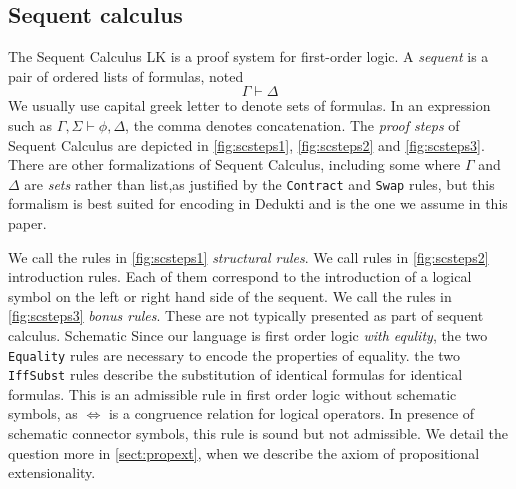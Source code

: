 \documentclass{article}
\begin{document}
	\iffalse
	We consider first order logic with arbitrary constant function and predicate symbols. Fomally We fix:
	\begin{itemize}
		\item a set of constant symbols $C$ noted $f^j, g^j, h^j, f^j_i,...$ for indices $i\in \mathbb{N}$ and where the superscript $j$ denotes the \textit{arity} of the symbol
		\item a countably infinite set of schematic function symbols $'C$ noted $ 'f^j, 'g^j, 'h^j, f^j_i,...$ for indices $i\in \mathbb{N}$ and where the superscript $j$ denotes the \textit{arity} of the symbol.
	\end{itemize}
	We also call schematic functions symbols of arity 0 \textit{variables}, and note them $x,y,z$.
	The set of terms of height at most $n$ is
	$$\mathcal{T}_0 := \lbrace f^0 \mid f^0 \in C\rbrace \cup \lbrace 'f^0 \mid 'f^0 \in C \rbrace$$
	$$\mathcal{T}_{n+1} := \mathcal{T}_n \cup \lbrace f^j(\vec{t}) \mid f^j\in \mathcal{C}, \vec{t}\in \mathcal{T}_n^j, j>0 \rbrace \cup \lbrace 'f^j(\vec{t}) \mid 'f^j\in \mathcal{C}, \vec{t}\in \mathcal{T}_n^j, j>0 \rbrace$$
	and the set of all termsis $\mathcal T = \bigcup_{n=0}^\infty \mathcal{T}_n$.  Moreover, we allow \textit{schematic functions, predicate and connector symbols}.
	
	\fi
	\subsection{Sequent calculus}
	The Sequent Calculus LK is a proof system for first-order logic. A \textit{sequent} is a pair of ordered lists of formulas, noted
	$$
	\Gamma \vdash \Delta
	$$
	We usually use capital greek letter to denote sets of formulas. In an expression such as $\Gamma, \Sigma \vdash \phi, \Delta$, the comma denotes concatenation.
	The \textit{proof steps} of Sequent Calculus are depicted in \autoref{fig:scsteps1}, \autoref{fig:scsteps2} and \autoref{fig:scsteps3}. There are other formalizations of Sequent Calculus, including some where $\Gamma$ and $\Delta$ are \textit{sets} rather than list,as justified by the \texttt{Contract} and \texttt{Swap} rules, but this formalism is best suited for encoding in Dedukti and is the one we assume in this paper.

	We call the rules in \autoref{fig:scsteps1} \textit{structural rules}. We call rules in \autoref{fig:scsteps2} introduction rules. Each of them correspond to the introduction of a logical symbol on the left or right hand side of the sequent.
	We call the rules in \autoref{fig:scsteps3} \textit{bonus rules}. These are not typically presented as part of sequent calculus. 
	Schematic 	
	Since our language is first order logic \textit{with equlity}, the two \texttt{Equality} rules are necessary to encode the properties of equality. the two \texttt{IffSubst} rules describe the substitution of identical formulas for identical formulas. This is an admissible rule in first order logic without schematic symbols, as $\iff$ is a congruence relation for logical operators. In presence of schematic connector symbols, this rule is sound but not admissible. We detail the question more in \autoref{sect:propext}, when we describe the axiom of propositional extensionality.
	
\end{document}
